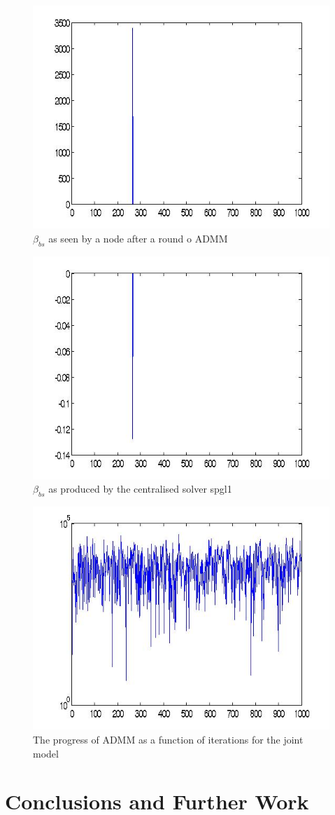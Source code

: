 \documentclass{article}
\begin{document}
\begin{figure}[h]
\centering
\includegraphics[height = 5 cm]{node1.jpg}
\caption{\(\beta_{bs}\) as seen by a node after a round o ADMM}
\label{betanode}
\end{figure}

\begin{figure}[h]
\centering
\includegraphics[height = 5 cm]{spatialcentral.jpg}
\caption{\(\beta_{bs}\) as produced by the centralised solver spgl1}
\label{betacentral}
\end{figure}

\begin{figure}[h]
\centering
\includegraphics[height = 5 cm]{spatialiterations.jpg}
\caption{The progress of ADMM as a function of iterations for the joint model}
\label{spatialiterations}
\end{figure}

\section{Conclusions and Further Work}
\end{document}
